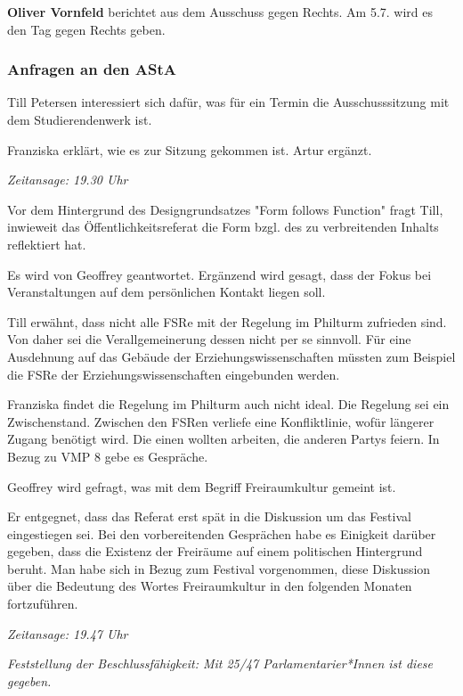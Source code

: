 \documentclass[ngerman,headheight=70pt]{scrartcl}
\begin{document}
    \textbf{Oliver Vornfeld} berichtet aus dem Ausschuss gegen Rechts. Am 5.7.
    wird es den Tag gegen Rechts geben.

    \subsubsection{Anfragen an den AStA}

    Till Petersen interessiert sich dafür, was für ein Termin die Ausschusssitzung
    mit dem Studierendenwerk ist.

    Franziska erklärt, wie es zur Sitzung gekommen ist. Artur ergänzt.

    \textit{Zeitansage: 19.30 Uhr}

    Vor dem Hintergrund des Designgrundsatzes "Form follows Function" fragt Till,
    inwieweit das Öffentlichkeitsreferat die Form bzgl. des zu verbreitenden
    Inhalts reflektiert hat.

    Es wird von Geoffrey geantwortet. Ergänzend wird gesagt, dass der Fokus
    bei Veranstaltungen auf dem persönlichen Kontakt liegen soll.

    Till erwähnt, dass nicht alle FSRe mit der Regelung im Philturm zufrieden
    sind. Von daher sei die Verallgemeinerung dessen nicht per se sinnvoll. Für
    eine Ausdehnung auf das Gebäude der Erziehungswissenschaften müssten zum
    Beispiel die FSRe der Erziehungswissenschaften eingebunden werden.

    Franziska findet die Regelung im Philturm auch nicht ideal. Die Regelung sei
    ein Zwischenstand. Zwischen den FSRen verliefe eine Konfliktlinie, wofür längerer
    Zugang benötigt wird. Die einen wollten arbeiten, die anderen Partys feiern.
    In Bezug zu VMP 8 gebe es Gespräche.

    Geoffrey wird gefragt, was mit dem Begriff Freiraumkultur gemeint ist.

    Er entgegnet, dass das Referat erst spät in die Diskussion um das Festival
    eingestiegen sei. Bei den vorbereitenden Gesprächen habe es Einigkeit darüber
    gegeben, dass die Existenz der Freiräume auf einem politischen Hintergrund beruht.
    Man habe sich in Bezug zum Festival vorgenommen, diese Diskussion über die
    Bedeutung des Wortes Freiraumkultur in den folgenden Monaten fortzuführen.

    \textit{Zeitansage: 19.47 Uhr}

    \textit{Feststellung der Beschlussfähigkeit: Mit 25/47 Parlamentarier*Innen
    ist diese gegeben.}
\end{document}

